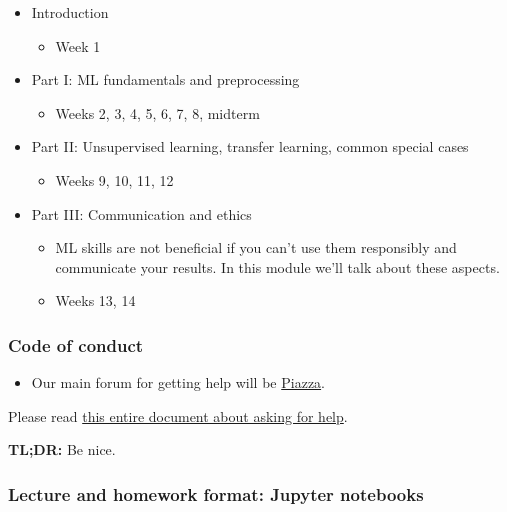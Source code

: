 \documentclass[11pt]{article}
\providecommand{\tightlist}{%
      \setlength{\itemsep}{0pt}\setlength{\parskip}{0pt}}
\begin{document}
\begin{itemize}
\tightlist
\item
  Introduction

  \begin{itemize}
  \tightlist
  \item
    Week 1
  \end{itemize}
\item
  Part I: ML fundamentals and preprocessing

  \begin{itemize}
  \tightlist
  \item
    Weeks 2, 3, 4, 5, 6, 7, 8, midterm
  \end{itemize}
\item
  Part II: Unsupervised learning, transfer learning, common special
  cases

  \begin{itemize}
  \tightlist
  \item
    Weeks 9, 10, 11, 12
  \end{itemize}
\item
  Part III: Communication and ethics

  \begin{itemize}
  \tightlist
  \item
    ML skills are not beneficial if you can't use them responsibly and
    communicate your results. In this module we'll talk about these
    aspects.
  \item
    Weeks 13, 14
  \end{itemize}
\end{itemize}

    \subsubsection{Code of conduct}\label{code-of-conduct}

\begin{itemize}
\tightlist
\item
  Our main forum for getting help will be
  \href{https://piazza.com/class/lr4y28ceun367s}{Piazza}.
\end{itemize}

    Please read
\href{https://github.com/UBC-CS/cpsc330-2023W2//blob/master/docs/asking_for_help.md}{this
entire document about asking for help}.

\textbf{TL;DR:} Be nice.

    \subsubsection{Lecture and homework format: Jupyter
notebooks}\label{lecture-and-homework-format-jupyter-notebooks}
\end{document}
